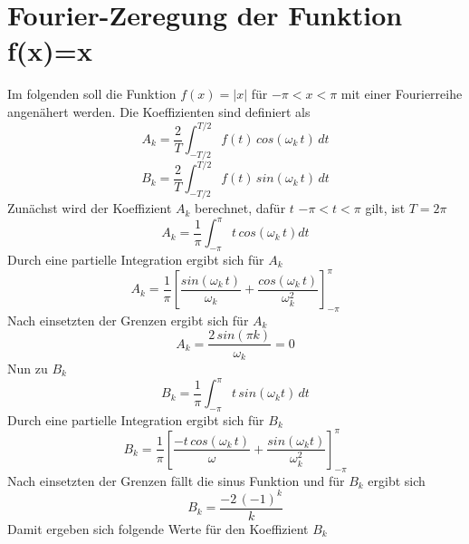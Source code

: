 \section{Fourier-Zeregung der Funktion f(x)=x}
    Im folgenden soll die Funktion $f(x)=|x|$ für $-\pi < x < \pi$ mit einer Fourierreihe angenähert werden.
    Die Koeffizienten sind definiert als
\newpage
\begin{equation}
  A_k=\frac{2}{T} \int_{-T/2}^{T/2} f(t) \, cos(\omega_k \, t) \,  dt
\end{equation}
\begin{equation}
  B_k=\frac{2}{T} \int_{-T/2}^{T/2} f(t) \, sin(\omega_k \, t) \, dt
\end{equation}
  Zunächst wird der Koeffizient $A_k$ berechnet, dafür $t$  $-\pi < t < \pi$ gilt, ist $T = 2\pi$
\begin{equation}
  A_k = \frac{1}{\pi} \int_{-\pi}^{\pi} t \, cos(\omega_k\, t) dt
\end{equation}
  Durch eine partielle Integration ergibt sich für $A_k$
\begin{equation}
  A_k= \frac{1}{\pi} \left [\frac{sin(\omega_k \, t)}{\omega_k} + \frac{cos(\omega_k \, t)}{\omega_k^2}  \right]_{-\pi}^{\pi} 
\end{equation}
  Nach einsetzten der Grenzen ergibt sich für $A_k$
\begin{equation}
  A_k = \frac{2 \, sin(\pi k)}{\omega_k} = 0
\end{equation}
  Nun zu $B_k$
\begin{equation}
  B_k = \frac{1}{\pi} \int_{-\pi}^{\pi} t \, sin (\omega_k t) \, dt
\end{equation}
  Durch eine partielle Integration ergibt sich für $B_k$
\begin{equation}
  B_k = \frac{1}{\pi} \left [\frac{- t \, cos(\omega_k \,  t)}{\omega} + \frac{sin(\omega_k t)}{\omega_k^2}\right]_{-\pi}^{\pi} 
\end{equation}
  Nach einsetzten der Grenzen fällt die sinus Funktion und für $B_k$ ergibt sich
\begin{equation}
  B_k = \frac{-2 \, (-1)^k}{k}
\end{equation}
Damit ergeben sich folgende Werte für den Koeffizient $B_k$
